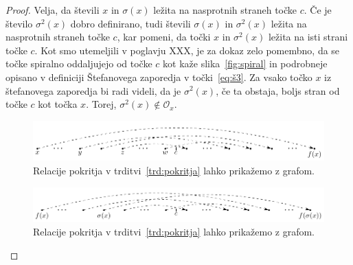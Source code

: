 \documentclass[mat2]{fmfdelo}
\begin{document}
\begin{proof}
Velja, da števili $x$ in $\sigma(x)$ ležita na nasprotnih straneh točke $c$. Če je število $\sigma^2(x)$ dobro definirano, tudi števili $\sigma(x)$ in $\sigma^2(x)$ ležita na nasprotnih straneh točke $c$, kar pomeni, da točki $x$ in $\sigma^2(x)$ ležita na isti strani točke $c$. Kot smo utemeljili v poglavju XXX, je za dokaz zelo pomembno, da se točke spiralno oddaljujejo od točke $c$ kot kaže slika~\ref{fig:spiral} in podrobneje opisano v definiciji Štefanovega zaporedja v točki~\ref{eq:š3}. Za vsako točko $x$ iz štefanovega zaporedja bi radi videli, da je $\sigma^2(x)$, če ta obstaja, boljs stran od točke $c$ kot točka $x$. Torej, $\sigma^2(x) \notin \mathcal{O}_x$.

\begin{figure}[h]
  \centering
  \includegraphics{images/mnozica_S.pdf}
  \caption[Primer vektorske slike.]{Relacije pokritja v trditvi~\ref{trd:pokritja} lahko prikažemo z grafom.}
  \label{fig:S}
\end{figure}

\begin{figure}[h]
  \centering
  \includegraphics{images/sigma.pdf}
  \caption[Primer vektorske slike.]{Relacije pokritja v trditvi~\ref{trd:pokritja} lahko prikažemo z grafom.}
  \label{fig:sigma}
\end{figure}


\end{proof}
\end{document}
